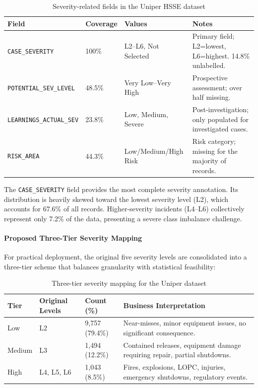 \documentclass[11pt, titlepage, bibliography=totoc]{scrreprt}
\begin{document}
\begin{table}[H]
\centering
\caption{Severity-related fields in the Uniper HSSE dataset}
\label{tab:severity_fields}
\begin{tabular}{llll}
\toprule
\textbf{Field} & \textbf{Coverage} & \textbf{Values} & \textbf{Notes} \\
\midrule
\texttt{CASE\_SEVERITY}           & 100\%  & L2--L6, Not Selected & Primary field; L2=lowest, L6=highest. 14.8\% unlabelled. \\
\texttt{POTENTIAL\_SEV\_LEVEL}    & 48.5\% & Very Low--Very High  & Prospective assessment; over half missing. \\
\texttt{LEARNINGS\_ACTUAL\_SEV}   & 23.8\% & Low, Medium, Severe  & Post-investigation; only populated for investigated cases. \\
\texttt{RISK\_AREA}               & 44.3\% & Low/Medium/High Risk & Risk category; missing for the majority of records. \\
\bottomrule
\end{tabular}
\end{table}

The \texttt{CASE\_SEVERITY} field provides the most complete severity annotation. Its distribution is heavily skewed toward the lowest severity level (L2), which accounts for 67.6\% of all records. Higher-severity incidents (L4--L6) collectively represent only 7.2\% of the data, presenting a severe class imbalance challenge.

\paragraph{Proposed Three-Tier Severity Mapping}
For practical deployment, the original five severity levels are consolidated into a three-tier scheme that balances granularity with statistical feasibility:

\begin{table}[H]
\centering
\caption{Three-tier severity mapping for the Uniper dataset}
\label{tab:three_tier}
\begin{tabular}{llll}
\toprule
\textbf{Tier} & \textbf{Original Levels} & \textbf{Count (\%)} & \textbf{Business Interpretation} \\
\midrule
Low    & L2         & 9{,}757 (79.4\%) & Near-misses, minor equipment issues, no significant consequence. \\
Medium & L3         & 1{,}494 (12.2\%) & Contained releases, equipment damage requiring repair, partial shutdowns. \\
High   & L4, L5, L6 & 1{,}043 (8.5\%)  & Fires, explosions, LOPC, injuries, emergency shutdowns, regulatory events. \\
\bottomrule
\end{tabular}
\end{table}
\end{document}
